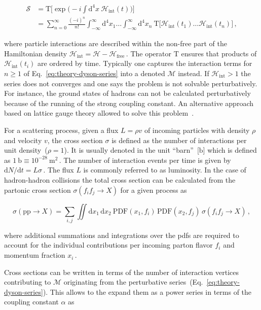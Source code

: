 \begin{align}
\mathcal{S}&=\mathrm{T}\Big[\exp\Big(-i\int\mathrm{d}^{4}x~\mathcal{H}_\mathrm{int}(t)\Big)\Big]\nonumber\\
&=\sum_{n=0}^{\infty}\frac{(-i)^{n}}{n!}\int_{-\infty}^{\infty}\mathrm{d}^{4}x_{1}\ldots \int_{-\infty}^{\infty}\mathrm{d}^{4}x_{n}~\mathrm{T}\Big[\mathcal{H}_\mathrm{int}(t_{1})\ldots\mathcal{H}_\mathrm{int}(t_{n})\Big]\,, \label{eq:theory-dyson-series}
\end{align}

where particle interactions are described within the non-free part of the Hamiltonian density $\mathcal{H}_\mathrm{int}=\mathcal{H}-\mathcal{H}_\mathrm{free}\,$. The operator $\mathrm{T}$ ensures that products of $\mathcal{H}_\mathrm{int}(t_{i})$ are ordered by time. Typically one captures the interaction terms for $n\geq1$ of Eq.~\ref{eq:theory-dyson-series} into a  denoted $\mathcal{M}$ instead. If $\mathcal{H}_\mathrm{int}>1$ the series does not converges and one says the problem is not solvable perturbatively. For instance, the ground states of hadrons can not be calculated perturbatively because of the running of the strong coupling constant. An alternative approach based on lattice gauge theory allowed to solve this problem~\cite{Durr:2008zz}.

For a scattering process, given a flux $L=\rho v$ of incoming particles with density $\rho$ and velocity $v$, the cross section $\sigma$ is defined as the number of interactions per unit density~($\rho=1$). It is usually denoted in the unit ``barn''~[$\mathrm{b}$] which is defined as $1~\mathrm{b}\equiv 10^{-28}~\mathrm{m}^{2}\,$.  The number of interaction events per time is given by $\mathrm{d}N/\mathrm{d}t=L\sigma\,$. The flux $L$ is commonly referred to as luminosity. In the case of hadron-hadron collisions the total cross section can be calculated from the partonic cross section $\sigma(f_{i}f_{j}\to X)$ for a given process  as

\begin{equation}
\sigma(\mathrm{pp}\to X)=\sum_{i,j}\iint\mathrm{d}x_{1}\,\mathrm{d}x_{2}~\mathrm{PDF}(x_{1},f_{i})\,\mathrm{PDF}(x_{2},f_{j})\,\sigma(f_{i}f_{j}\to X)\,,
\end{equation}

where additional summations and integrations over the \glspl{pdf} are required to account for the individual contributions per incoming parton flavor $f_{i}$ and momentum fraction $x_{i}\,$.

Cross sections can be written in terms of the number of interaction vertices contributing to $\mathcal{M}$ originating from the perturbative series~(Eq.~\ref{eq:theory-dyson-series}). This allows to the expand them as a power series in terms of the coupling constant $\alpha$ as

